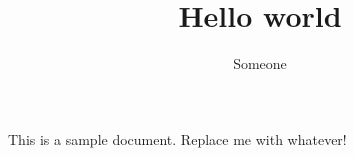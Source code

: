\documentclass[]{article}
\title{Hello world}
\author{Someone}
\begin{document}
\maketitle

This is a sample document. Replace me with whatever!
\end{document}
